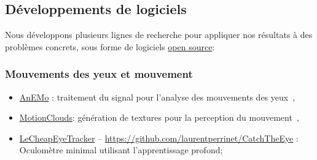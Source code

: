 \documentclass[10pt,french,a4paper,oneside]{article}%
\begin{document}
\subsection{Développements de logiciels} %

Nous développons plusieurs lignes de recherche pour appliquer nos résultats à des problèmes concrets, sous forme de logiciels \href{https://laurentperrinet.github.io/project/open-science/}{open source}:

\subsubsection{Mouvements des yeux et mouvement} %
\begin{itemize}

	\item \href{https://github.com/invibe/AnEMo}{AnEMo} : traitement du signal pour l'analyse des mouvements des yeux~\citep{Pasturel18anemo},
	\item \href{http://github.com/NeuralEnsemble/MotionClouds}{MotionClouds}: génération de textures pour la perception du mouvement~\citep{Sanz12,Vacher15nips,Vacher16},
	\item \href{https://github.com/laurentperrinet/LeCheapEyeTracker}{LeCheapEyeTracker} -- \url{https://github.com/laurentperrinet/CatchTheEye} : Oculomètre minimal utilisant l'apprentissage profond;
\end{itemize}
\end{document}
